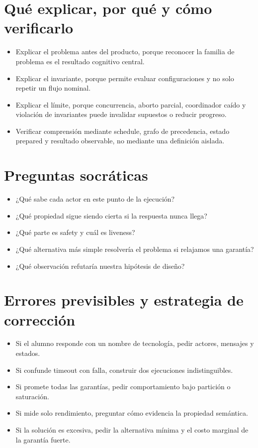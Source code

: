 \documentclass[variant=docente,cover=institutional,mode=screen]{ua-engineering-v6-article}
\begin{document}
\section{Qué explicar, por qué y cómo verificarlo}
\begin{itemize}
\item Explicar el problema antes del producto, porque reconocer la familia de problema es el resultado cognitivo central.
\item Explicar el invariante, porque permite evaluar configuraciones y no solo repetir un flujo nominal.
\item Explicar el límite, porque concurrencia, aborto parcial, coordinador caído y violación de invariantes puede invalidar supuestos o reducir progreso.
\item Verificar comprensión mediante schedule, grafo de precedencia, estado prepared y resultado observable, no mediante una definición aislada.
\end{itemize}

\section{Preguntas socráticas}
\begin{itemize}
\item ¿Qué sabe cada actor en este punto de la ejecución?
\item ¿Qué propiedad sigue siendo cierta si la respuesta nunca llega?
\item ¿Qué parte es safety y cuál es liveness?
\item ¿Qué alternativa más simple resolvería el problema si relajamos una garantía?
\item ¿Qué observación refutaría nuestra hipótesis de diseño?
\end{itemize}

\section{Errores previsibles y estrategia de corrección}
\begin{itemize}
\item Si el alumno responde con un nombre de tecnología, pedir actores, mensajes y estados.
\item Si confunde timeout con falla, construir dos ejecuciones indistinguibles.
\item Si promete todas las garantías, pedir comportamiento bajo partición o saturación.
\item Si mide solo rendimiento, preguntar cómo evidencia la propiedad semántica.
\item Si la solución es excesiva, pedir la alternativa mínima y el costo marginal de la garantía fuerte.
\end{itemize}
\end{document}
